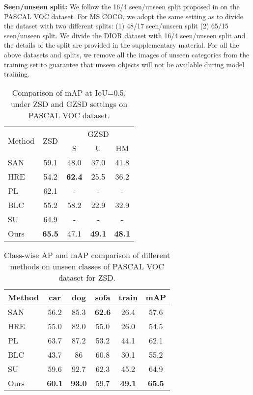 \documentclass[10pt,twocolumn,letterpaper]{article}
\begin{document}
\textbf{Seen/unseen split:}
We follow the 16/4 seen/unseen split proposed in \cite{Demirel2018ZeroShotOD} on the PASCAL VOC dataset. For MS COCO, we adopt the same setting as \cite{bansal2018zero} to divide the dataset with two different splits: (1) 48/17 seen/unseen split (2) 65/15 seen/unseen split. We divide the DIOR dataset with 16/4 seen/unseen split and the details of the split are provided in the supplementary material. For all the above datasets and splits, we remove all the images of unseen categories from the training set to guarantee that unseen objects will not be available during model training.
\begin{table}[t]
  \centering
  \caption{Comparison of mAP at IoU=0.5, under ZSD and GZSD settings on PASCAL VOC dataset.}
  \vspace{-3mm}
  \renewcommand\tabcolsep{9.0pt}
    \begin{tabular}{lcccc}
    \toprule
    \multirow{2}[4]{*}{Method} & \multirow{2}[4]{*}{ZSD} & \multicolumn{3}{c}{GZSD} \\
\cmidrule{3-5}          &       & S     & U     & HM \\
    \midrule
    SAN \cite{rahman2018zero}  & 59.1  & 48.0    & 37.0    & 41.8 \\
    HRE \cite{Demirel2018ZeroShotOD}  & 54.2  & \textbf{62.4}  & 25.5  & 36.2 \\
    PL \cite{rahman2020improved}   & 62.1  & -     & -     & - \\
    BLC \cite{zheng2020background}  & 55.2  & 58.2  & 22.9  & 32.9 \\
    SU \cite{hayat2020synthesizing}   & 64.9  & -     & -     & - \\
    Ours  & \textbf{65.5}     & 47.1     & \textbf{49.1}     & \textbf{48.1} \\
    \bottomrule
    \end{tabular}\label{tab-voc}\end{table}\begin{table}[t]
  \centering
  \caption{Class-wise AP and mAP comparison of different methods on unseen classes of PASCAL VOC dataset for ZSD.}
\renewcommand\tabcolsep{8.0pt}
    \begin{tabular}{lccccc}
    \toprule
    Method & car   & dog   & sofa  & train & mAP \\
    \midrule
    SAN \cite{rahman2018zero}  & 56.2  & 85.3  & \textbf{62.6}  & 26.4  & 57.6 \\
    HRE \cite{Demirel2018ZeroShotOD}  & 55.0    & 82.0    & 55.0    & 26.0    & 54.5 \\
    PL \cite{rahman2020improved}   & 63.7  & 87.2  & 53.2  & 44.1  & 62.1 \\
    BLC \cite{zheng2020background}  & 43.7  & 86    & 60.8  & 30.1  & 55.2 \\
    SU \cite{hayat2020synthesizing}   & 59.6  & 92.7  & 62.3  & 45.2  & 64.9 \\
    Ours  & \textbf{60.1}     & \textbf{93.0}     & 59.7     & \textbf{49.1}     & \textbf{65.5} \\
    \bottomrule
    \end{tabular}\label{clase-wise-AP-voc}\end{table}
\end{document}
